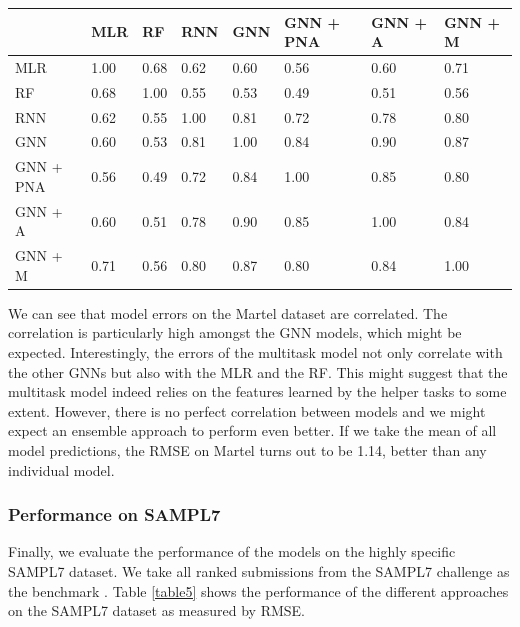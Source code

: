 \documentclass{article}
\theoremstyle{definition}
\theoremstyle{remark}
\begin{document}
\begin{center}
\begin{tabular}{ | m{0.8cm} | m{0.8cm}| m{0.8cm}| m{0.8cm}| m{0.8cm}| m{0.8cm}| m{0.8cm}| m{0.8cm}| } 
  \hline
   & MLR & RF & RNN & GNN & GNN + PNA & GNN + A & GNN + M \\ 
  \hline
   MLR & 1.00 & 0.68 & 0.62 & 0.60 & 0.56 & 0.60 & 0.71 \\ 
  \hline
  RF & 0.68 & 1.00 & 0.55 & 0.53 & 0.49 & 0.51 & 0.56 \\ 
  \hline
  RNN & 0.62 & 0.55 & 1.00 & 0.81 & 0.72 & 0.78 & 0.80 \\ 
  \hline
  GNN & 0.60 & 0.53 & 0.81 & 1.00 & 0.84 & 0.90 & 0.87\\ 
  \hline
  GNN + PNA & 0.56 & 0.49 & 0.72 & 0.84 & 1.00 & 0.85 & 0.80\\ 
  \hline
  GNN + A & 0.60 & 0.51 & 0.78 & 0.90 & 0.85 & 1.00 & 0.84\\ 
  \hline
  GNN + M & 0.71 & 0.56 & 0.80 & 0.87 & 0.80 & 0.84 & 1.00\\ 
  \hline

\end{tabular}
\captionsetup{width=0.8\textwidth}
\label{table4}
\end{center}

We can see that model errors on the Martel dataset are correlated. The correlation is particularly high amongst the GNN models, which might be expected. Interestingly, the errors of the multitask model not only correlate with the other GNNs but also with the MLR and the RF. This might suggest that the multitask model indeed relies on the features learned by the helper tasks to some extent. However, there is no perfect correlation between models and we might expect an ensemble approach to perform even better. If we take the mean of all model predictions, the RMSE on Martel turns out to be 1.14, better than any individual model. \\

\subsubsection{Performance on SAMPL7}

Finally, we evaluate the performance of the models on the highly specific SAMPL7 dataset. We take all ranked submissions from the SAMPL7 challenge as the benchmark \cite{teresa_danielle_bergazin_2021_5637494}. Table \ref{table5} shows the performance of the different approaches on the SAMPL7 dataset as measured by RMSE.
\end{document}
